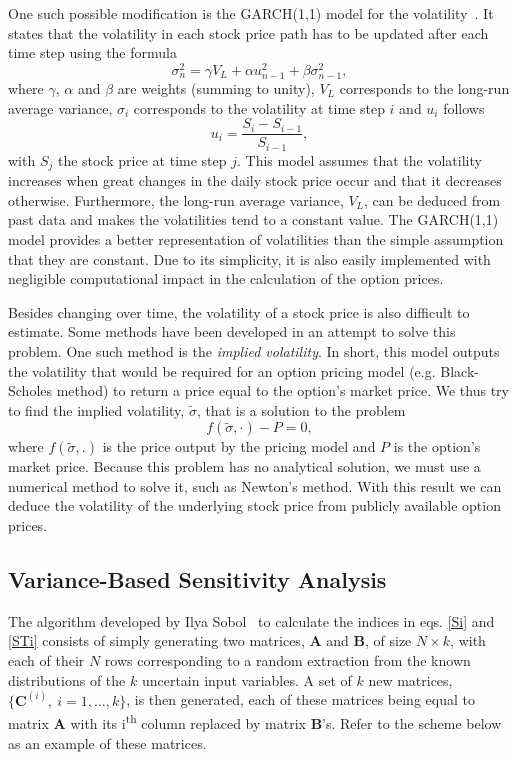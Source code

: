 \documentclass[a4paper,twocolumn,aps,prd,longbibliography,superscriptaddress]{revtex4-1}
\begin{document}
One such possible modification is the GARCH(1,1) model for the volatility~\cite{Wei}.
It states that the volatility in each stock price path has to be updated after each time step using the formula
\begin{equation}
\sigma_n^2=\gamma V_L+\alpha u_{n-1}^2+\beta\sigma_{n-1}^2,
\end{equation}
\noindent where $\gamma$, $\alpha$ and $\beta$ are weights (summing to unity), $V_L$ corresponds to the long-run average variance, $\sigma_i$ corresponds to the volatility at time step $i$ and $u_i$ follows
\begin{equation}
u_i=\frac{S_i-S_{i-1}}{S_{i-1}},
\end{equation}
\noindent with $S_j$ the stock price at time step $j$.
This model assumes that the volatility increases when great changes in the daily stock price occur and that it decreases otherwise. Furthermore, the long-run average variance, $V_L$, can be deduced from past data and makes the volatilities tend to a constant value.
The GARCH(1,1) model provides a better representation of volatilities than the simple assumption that they are constant. Due to its simplicity, it is also easily implemented with negligible computational impact in the calculation of the option prices.

Besides changing over time, the volatility of a stock price is also difficult to estimate. Some methods have been developed in an attempt to solve this problem. One such method is the \textit{implied volatility}. In short, this model outputs the volatility that would be required for an option pricing model (e.g. Black-Scholes method) to return a price equal to the option's market price.
We thus try to find the implied volatility, $\widetilde{\sigma}$, that is a solution to the problem
\begin{equation}
f(\widetilde{\sigma},\cdot)-P=0,
\end{equation}
\noindent where $f(\widetilde{\sigma},.)$ is the price output by the pricing model and $P$ is the option's market price.
Because this problem has no analytical solution, we must use a numerical method to solve it, such as Newton's method.
With this result we can deduce the volatility of the underlying stock price from publicly available option prices.


\subsection{Variance-Based Sensitivity Analysis}
The algorithm developed by Ilya Sobol~\cite{Sobol} to calculate the indices in eqs. \eqref{Si} and \eqref{STi} consists of simply generating two matrices, $\mathbf{A}$ and $\mathbf{B}$, of size $N\times k$, with each of their $N$ rows corresponding to a random extraction from the known distributions of the $k$ uncertain input variables.
A set of $k$ new matrices, $\{\mathbf{C}^{(i)},\ i=1,\dots,k\}$, is then generated, each of these matrices being equal to matrix $\mathbf{A}$ with its i\textsuperscript{th} column replaced by matrix $\mathbf{B}$'s. Refer to the scheme below as an example of these matrices.
\end{document}
